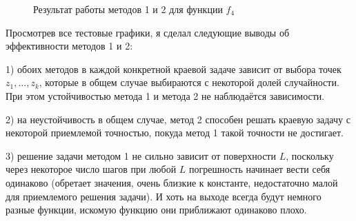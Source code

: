 \documentclass[a4paper]{article}
\begin{document}
\begin{figure}[h!]
  \caption{Результат работы методов 1 и 2 для функции $f_4$}
  \label{send}
\end{figure}

\FloatBarrier
Просмотрев все тестовые графики, я сделал следующие выводы об эффективности методов 1 и 2:

  1) { обоих методов в каждой конкретной краевой задаче зависит от выбора точек $z_1, \dots, z_k$}, которые в общем случае выбираются с некоторой долей случайности. При этом { устойчивостью метода 1 и метода 2 не наблюдаётся зависимости}.
  
  2) { на неустойчивость в общем случае, метод 2 способен решать краевую задачу с некоторой приемлемой точностью, покуда метод 1 такой точности не достигает}.
  
  3) { решение задачи методом 1 не сильно зависит от поверхности $L$, поскольку через некоторое число шагов при любой $L$ погрешность начинает вести себя одинаково} (обретает значения, очень близкие к константе, недостаточно малой для приемлемого решения задачи). И хоть на выходе всегда будут немного разные функции, искомую функцию они приближают одинаково плохо.
  
\end{document}
